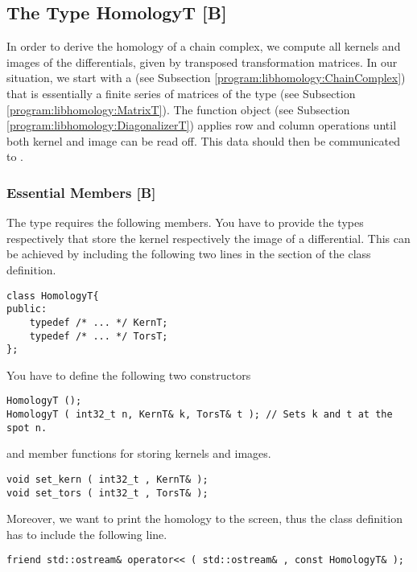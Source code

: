 \subsection{The Type HomologyT [B]}
\label{program:libhomology:HomologyT}
In order to derive the homology of a chain complex, we compute all kernels and images of the differentials, given by transposed transformation matrices.
In our situation, we start with a  (see Subsection \ref{program:libhomology:ChainComplex}) that is essentially a finite series of matrices of the type  (see Subsection \ref{program:libhomology:MatrixT}).
The function object  (see Subsection \ref{program:libhomology:DiagonalizerT}) applies row and column operations until both kernel and image can be read off.
This data should then be communicated to .

\subsubsection{Essential Members [B]}
The type  requires the following members.
You have to provide the types \progname{::} respectively \progname{::} that store the kernel respectively the image of a differential.
This can be achieved by including the following two lines in the  section of the class definition.
\begin{lstlisting}
class HomologyT{
public:
    typedef /* ... */ KernT;
    typedef /* ... */ TorsT;
};
\end{lstlisting}
You have to define the following two constructors
\begin{lstlisting}
HomologyT ();
HomologyT ( int32_t n, KernT& k, TorsT& t ); // Sets k and t at the spot n.
\end{lstlisting}
and member functions for storing kernels and images.
\begin{lstlisting}
void set_kern ( int32_t , KernT& );
void set_tors ( int32_t , TorsT& );
\end{lstlisting}
Moreover, we want to print the homology to the screen, thus the class definition has to include the following line.
\begin{lstlisting}
friend std::ostream& operator<< ( std::ostream& , const HomologyT& );
\end{lstlisting}

